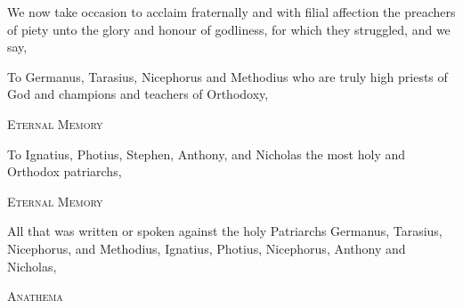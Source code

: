 We now take occasion to acclaim fraternally and with filial affection the preachers of piety unto the glory and honour of godliness, for which they struggled, and we say,

To Germanus, Tarasius, Nicephorus  and Methodius who are truly high priests of God and champions and teachers of Orthodoxy,

\begin{center}
\textsc{Eternal Memory} 
\end{center}

To Ignatius, Photius, Stephen, Anthony, and Nicholas the most holy and Orthodox patriarchs,

\begin{center}
\textsc{Eternal Memory} 
\end{center}

All that was written or spoken against the holy Patriarchs Germanus, Tarasius, Nicephorus, and Methodius, Ignatius, Photius, Nicephorus, Anthony and Nicholas,

\begin{center}
\textsc{Anathema} 
\end{center}
